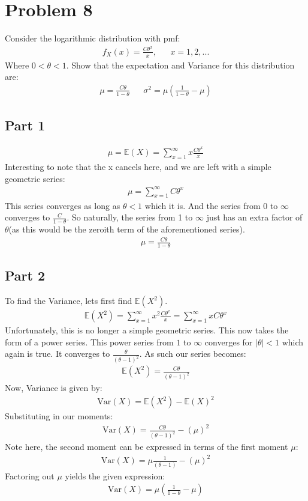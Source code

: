 \documentclass{article}
\begin{document}
\section*{Problem 8}
Consider the logarithmic distribution with pmf:
\begin{align*}
f_X(x)=\frac{C \theta^x}{x}, && x=1,2,...
\end{align*}
Where $0<\theta < 1$. Show that the expectation and Variance for this distribution are:
\begin{align*}
\mu = \frac{C \theta}{1-\theta} && \sigma^2 = \mu (\frac{1}{1-\theta} - \mu)
\end{align*}
\subsection*{Part 1}
\begin{align*}
\mu = \mathbb{E}(X) = \sum_{x=1}^{\infty} x \frac{C \theta^x}{x}
\end{align*}
Interesting to note that the x cancels here, and we are left with a simple geometric series:
\begin{align*}
\mu =  \sum_{x=1}^{\infty} C \theta^x
\end{align*} 
This series converges as long as $\theta<1$ which it is. And the series from $0$ to $\infty$ converges to $\frac{C}{1-\theta}$. So naturally, the series from 1 to $\infty$ just has an extra factor of $\theta$(as this would be the zeroith term of the aforementioned series).
\begin{align*}
\boxed{ \mu =  \frac{C \theta}{1-\theta} }
\end{align*}
\subsection*{Part 2}
To find the Variance, lets first find $\mathbb{E}(X^2)$.
\begin{align*}
\mathbb{E}(X^2) =  \sum_{x=1}^{\infty} x^2 \frac{C \theta^x}{x} = \sum_{x=1}^{\infty} x C \theta^x 
\end{align*}
Unfortunately, this is no longer a simple geometric series. This now takes the form of a power series. This power series from $1$ to $\infty$ converges for $|\theta|<1$ which again is true. It converges to $\frac{\theta}{(\theta-1)^2}$. As such our series becomes:
\begin{align*}
\mathbb{E}(X^2) =  \frac{C \theta}{(\theta-1)^2}
\end{align*}
Now, Variance is given by:
\begin{align*}
\text{Var}(X) =  \mathbb{E}(X^2) - \mathbb{E}(X)^2
\end{align*}
Substituting in our moments:
\begin{align*}
\text{Var}(X) =  \frac{C \theta}{(\theta-1)^2} - (\mu)^2
\end{align*}
Note here, the second moment can be expressed in terms of the first moment $\mu$:
\begin{align*}
\text{Var}(X) =  \mu \frac{1}{(\theta-1)} - (\mu)^2
\end{align*}
Factoring out $\mu$ yields the given expression:
\begin{align*}
\boxed{ \text{Var}(X) =  \mu (\frac{1}{1-\theta} - \mu) }
\end{align*}
\end{document}
